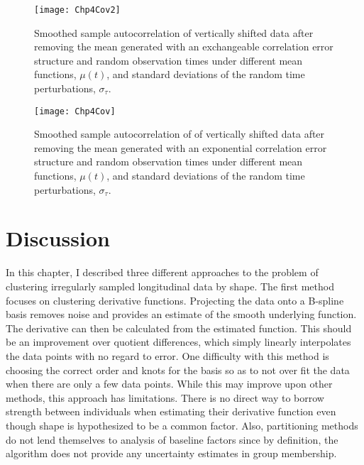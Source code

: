 \begin{landscape}
\begin{figure}
\begin{center}
\texttt{[image: Chp4Cov2]}
\end{center}
\caption{Smoothed sample autocorrelation of vertically shifted data after removing the mean generated with an exchangeable correlation error structure and random observation times under different mean functions, $\mu(t)$, and standard deviations of the random time perturbations, $\sigma_{\tau}$.}
\label{fig:cov1}
\end{figure}

\begin{figure}
\begin{center}
\texttt{[image: Chp4Cov]}
\end{center}
\caption{Smoothed sample autocorrelation of of vertically shifted data after removing the mean generated with an exponential correlation error structure and random observation times under different mean functions, $\mu(t)$, and standard deviations of the random time perturbations, $\sigma_{\tau}$.}
\label{fig:cov}
\end{figure}
\end{landscape}



\section{Discussion}
In this chapter, I described three different approaches to the problem of clustering irregularly sampled longitudinal data by shape. The first method focuses on clustering derivative functions. Projecting the data onto a B-spline basis removes noise and provides an estimate of the smooth underlying function. The derivative can then be calculated from the estimated function. This should be an improvement over quotient differences, which simply linearly interpolates the data points with no regard to error. One difficulty with this method is choosing the correct order and knots for the basis so as to not over fit the data when there are only a few data points. While this may improve upon other methods, this approach has limitations. There is no direct way to borrow strength between individuals when estimating their derivative function even though shape is hypothesized to be a common factor. Also, partitioning methods do not lend themselves to analysis of baseline factors since by definition, the algorithm does not provide any uncertainty estimates in group membership.  

